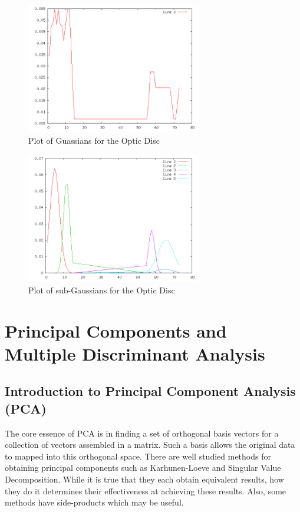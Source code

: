 \documentclass[12pt]{report}
\begin{document}
\begin{figure}[htbp] %
   \centering
   \includegraphics[width=3in]{plot.png} 
   \caption{Plot of Guassians for the Optic Disc}
   \label{histogram-optic-disc}
\end{figure}


\begin{figure}[htbp] %
   \centering
   \includegraphics[width=3in]{probability.png} 
   \caption{Plot of sub-Gaussians for the Optic Disc}
   \label{histograms-optic-disc}
\end{figure}

\section{Principal Components and Multiple Discriminant Analysis}

\subsection{Introduction to Principal Component Analysis (PCA)}

The core essence of PCA is in finding a set of orthogonal basis vectors for a collection of vectors assembled in a matrix.  Such a basis allows the original data to mapped into this orthogonal space.  There are well studied methods for obtaining principal components such as Karhunen-Loeve and Singular Value Decomposition.  While it is true that they each obtain equivalent results, how they do it determines their effectiveness at achieving these results.  Also, some methods have side-products which may be useful.  
\end{document}
